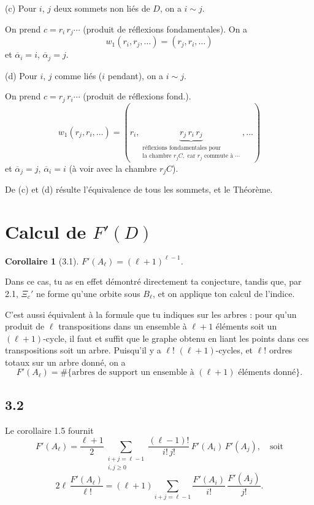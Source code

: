 \documentclass[11pt,a4paper]{article}
\theoremstyle{plain}
\newtheorem{corollary}[theorem]{Corollaire}
\theoremstyle{definition}
\begin{document}
\smallskip

(c) Pour $i$, $j$ deux sommets non li\'es de $D$, on a $i \sim j$.

On prend $c = r_i\, r_j \cdots$ (produit de r\'eflexions fondamentales). On a
\[
w_1(r_i, r_j, \ldots) = (r_j, r_i, \ldots)
\]
et $\overline{\alpha}_i = i$, $\overline{\alpha}_j = j$.

\smallskip

(d) Pour $i$, $j$ comme li\'es ($i$ pendant), on a $i \sim j$.

On prend $c = r_j\, r_i \cdots$ (produit de r\'eflexions fond.).
\[
w_1(r_j, r_i, \ldots) = (r_i, \underbrace{r_j\, r_i\, r_j}_{\substack{\text{r\'eflexions fondamentales pour} \\ \text{la chambre } r_j C, \text{ car } r_j \text{ commute \`a } \cdots}}, \ldots)
\]
et $\overline{\alpha}_j = j$, $\overline{\alpha}_i = i$ (\`a voir avec la chambre $r_j C$).

\bigskip

De (c) et (d) r\'esulte l'\'equivalence de tous les sommets, et le Th\'eor\`eme.

\newpage

\section{Calcul de $F'(D)$}

\begin{corollary}[3.1]
$F'(A_\ell) = (\ell+1)^{\ell-1}$.
\end{corollary}

Dans ce cas, tu as en effet d\'emontr\'e directement ta conjecture, tandis que, par 2.1, $\Xi_c'$ ne forme qu'une orbite sous $B_\ell$, et on applique ton calcul de l'indice.

C'est aussi \'equivalent \`a la formule que tu indiques sur les arbres : pour qu'un produit de $\ell$ transpositions dans un ensemble \`a $\ell+1$ \'el\'ements soit un $(\ell+1)$-cycle, il faut et suffit que le graphe obtenu en liant les points dans ces transpositions soit un arbre. Puisqu'il y a $\ell!$ $(\ell+1)$-cycles, et $\ell!$ ordres totaux sur un arbre donn\'e, on a
\[
F'(A_\ell) = \#\{\text{arbres de support un ensemble \`a } (\ell+1) \text{ \'el\'ements donn\'e}\}.
\]

\subsection*{3.2}

Le corollaire 1.5 fournit
\[
F'(A_\ell) = \frac{\ell+1}{2} \sum_{\substack{i+j=\ell-1 \\ i,j \geq 0}} \frac{(\ell-1)!}{i!\, j!}\, F'(A_i)\, F'(A_j), \quad \text{soit}
\]
\[
2\ell \, \frac{F'(A_\ell)}{\ell!} = (\ell+1) \sum_{i+j=\ell-1} \frac{F'(A_i)}{i!}\, \frac{F'(A_j)}{j!}.
\]
\end{document}
